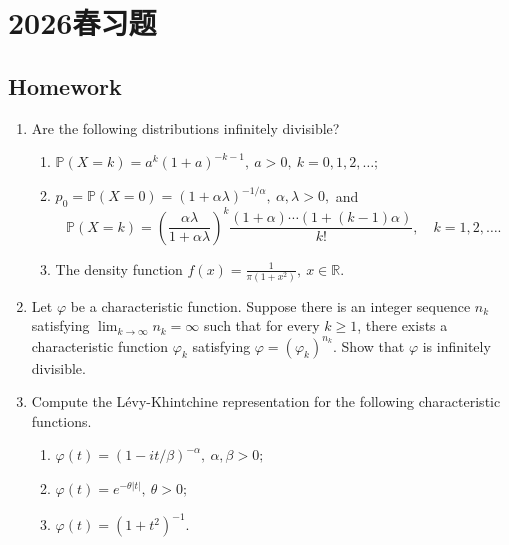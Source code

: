 
\section{2026春习题}
\subsection{Homework}

\begin{enumerate}
    \item  Are the following distributions infinitely divisible?

    \begin{enumerate}
        \item[(i)] \(\displaystyle \mathbb{P}(X = k) = a^k (1 + a)^{-k-1}, \ a > 0, \ k = 0, 1, 2, \dots;\)
        
        \item[(ii)] \(\displaystyle p_0 = \mathbb{P}(X = 0) = (1 + \alpha \lambda)^{-1/\alpha}, \ \alpha, \lambda > 0,\) and
        \[
        \mathbb{P}(X = k) = \left( \frac{\alpha \lambda}{1 + \alpha \lambda} \right)^k \frac{(1 + \alpha) \cdots (1 + (k - 1)\alpha)}{k!}, \quad k = 1, 2, \dots.
        \]
        
        \item[(iii)] The density function \(\displaystyle f(x) = \frac{1}{\pi (1 + x^2)}, \ x \in \mathbb{R}.\)
    \end{enumerate}

    \item  Let \(\varphi\) be a characteristic function. Suppose there is an integer sequence \(n_k\) satisfying \(\lim_{k \to \infty} n_k = \infty\) such that for every \(k \ge 1\), there exists a characteristic function \(\varphi_k\) satisfying \(\varphi = (\varphi_k)^{n_k}\). Show that \(\varphi\) is infinitely divisible.

    \item  Compute the Lévy-Khintchine representation for the following characteristic functions.

    \begin{enumerate}
        \item[(i)] \(\displaystyle \varphi(t) = (1 - it / \beta)^{-\alpha}, \ \alpha, \beta > 0;\)
        \item[(ii)] \(\displaystyle \varphi(t) = e^{-\theta |t|}, \ \theta > 0;\)
        \item[(iii)] \(\displaystyle \varphi(t) = (1 + t^2)^{-1}.\)
    \end{enumerate}


\end{enumerate}
